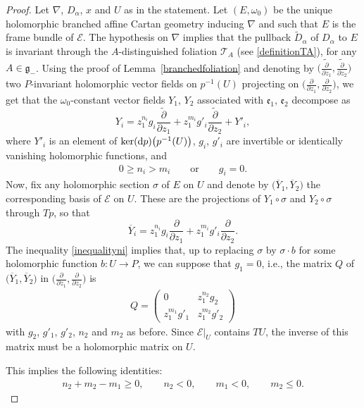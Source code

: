 \documentclass[pdftex]{sigma}
\newcommand{\der}[2]{\frac{\partial #1}{\partial#2}}
\numberwithin{equation}{section}
\begin{document}
\begin{proof} Let $\nabla$, $D_\alpha$, $x$ and $U$ as in the statement. Let $(E,\omega_0)$ be the unique holomorphic branched affine Cartan geometry inducing $\nabla$ and such that $E$ is the frame bundle of $\mathcal{E}$. The hypothesis on $\nabla$ implies that the pullback $\tilde{D}_\alpha$ of $D_\alpha$ to $E$ is invariant through the $A$-distinguished foliation $\mathcal{T}_A$ (see \eqref{definitionTA}), for any $A\in \mathfrak{g}_-$. Using the proof of Lemma~\ref{branchedfoliation} and denoting by $\big(\tilde{\der{}{z_1}},\tilde{\der{}{z_2}}\big)$ two $P$-invariant holomorphic vector fields on $p^{-1}(U)$ projecting on $\big(\der{}{z_1},\der{}{z_2}\big)$, we get that the $\omega_0$-constant vector fields $Y_1$, $Y_2$ associated with $\mathfrak{e}_1$, $\mathfrak{e}_2$ decompose as
\[ Y_i = z_1^{n_i}g_i \tilde{\der{}{z_1}} + z_1^{m_i}g'_i \tilde{\der{}{z_2}} + Y'_i,\]
 where $Y'_i$ is an element of $\ker({\rm d}p)\big(p^{-1}(U)\big)$, $g_i$, $g'_i$ are invertible or identically vanishing holomorphic functions, and
 \begin{gather}\label{inequalityni}
 0\geq n_i>m_i \qquad \text{or} \qquad g_i =0.\end{gather}
 Now, fix any holomorphic section $\sigma$ of $E$ on $U$ and denote by $\big(\overline{Y}_1,\overline{Y}_2\big)$ the corresponding basis of $\mathcal{E}$ on $U$. These are the projections of $Y_1\circ \sigma$ and $Y_2\circ \sigma$ through $Tp$, so that
\[\overline{Y}_i = z_1^{n_i}g_i \der{}{z_1} + z_1^{m_i}g'_i \der{}{z_2}.\]
 The inequality \eqref{inequalityni} implies that, up to replacing $\sigma$ by $\sigma\cdot b$ for some holomorphic function $b\colon U \longrightarrow P$, we can suppose that $g_1=0$, i.e., the matrix $Q$ of $\big(\overline{Y}_1,\overline{Y}_2\big)$ in $\big(\der{}{z_1},\der{}{z_2}\big)$ is
 \begin{gather*}Q= \begin{pmatrix} 0 & z_1^{n_2}g_2 \\ z_1^{m_1}g'_1 & z_1^{m_2}g'_2 \end{pmatrix} \end{gather*}
 with $g_2$, $g'_1$, $g'_2$, $n_2$ and $m_2$ as before. Since $\mathcal{E}\vert_U$ contains $TU$, the inverse of this matrix must be a holomorphic matrix on $U$.

 This implies the following identities:
 \begin{align}
 n_2+m_2-m_1 \geq 0,\qquad n_2 <0,\qquad m_1 < 0, \qquad
 m_2 \leq 0.\label{conditionsordres}
\end{align}


\end{proof}
\end{document}

